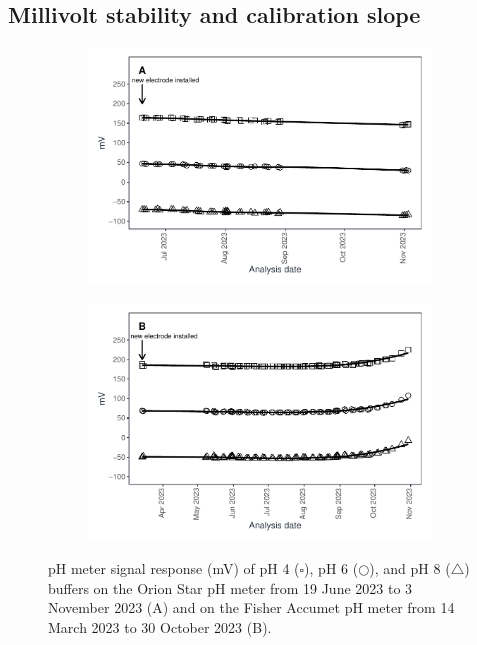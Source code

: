\documentclass[
]{article}
\begin{document}
\subsection{Millivolt stability and calibration slope}
\begin{figure}[h]
  \vspace{-0.4cm}
  \begin{subfigure}{0.48\textwidth}
  \includegraphics[]{orion_mV.pdf}
  \end{subfigure}%
  \begin{subfigure}{0.48\textwidth}
  \includegraphics[]{fisher_mV.pdf}
  \end{subfigure}
\caption{pH meter signal response (mV) of pH 4 ($\square$), pH 6 ($\bigcirc$), and pH 8 ($\bigtriangleup$) buffers on the Orion Star pH meter from 19 June 2023 to 3 November 2023 (A) and on the Fisher Accumet pH meter from 14 March 2023 to 30 October 2023 (B).}
\end{figure}
\end{document}
